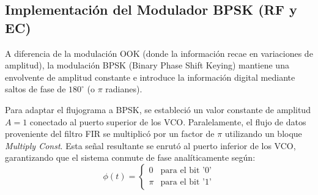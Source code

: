\subsection{Implementación del Modulador BPSK (RF y EC)}
A diferencia de la modulación OOK (donde la información recae en variaciones de amplitud), la modulación BPSK (Binary Phase Shift Keying) mantiene una envolvente de amplitud constante e introduce la información digital mediante saltos de fase de $180^\circ$ (o $\pi$ radianes).

Para adaptar el flujograma a BPSK, se estableció un valor constante de amplitud $A=1$ conectado al puerto superior de los VCO. Paralelamente, el flujo de datos proveniente del filtro FIR se multiplicó por un factor de $\pi$ utilizando un bloque \textit{Multiply Const}. Esta señal resultante se enrutó al puerto inferior de los VCO, garantizando que el sistema conmute de fase analíticamente según:
\begin{equation}
    \phi(t) = \begin{cases} 
      0 & \text{para el bit '0'} \\
      \pi & \text{para el bit '1'}
   \end{cases}
\end{equation}